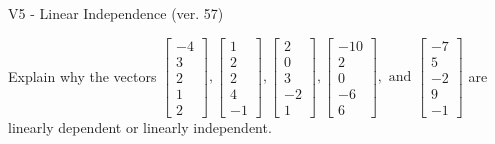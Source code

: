 \begin{exercise}
  \begin{exerciseTitle}V5 - Linear Independence (ver. 57)\end{exerciseTitle}
  \begin{exerciseStatement}
    Explain why the vectors \(\left[\begin{array}{r}
-4 \\
3 \\
2 \\
1 \\
2
\end{array}\right] , \left[\begin{array}{r}
1 \\
2 \\
2 \\
4 \\
-1
\end{array}\right] , \left[\begin{array}{r}
2 \\
0 \\
3 \\
-2 \\
1
\end{array}\right] , \left[\begin{array}{r}
-10 \\
2 \\
0 \\
-6 \\
6
\end{array}\right] , \text{ and } \left[\begin{array}{r}
-7 \\
5 \\
-2 \\
9 \\
-1
\end{array}\right]\) are linearly dependent or linearly independent.	



\end{exerciseStatement}
\end{exercise}
